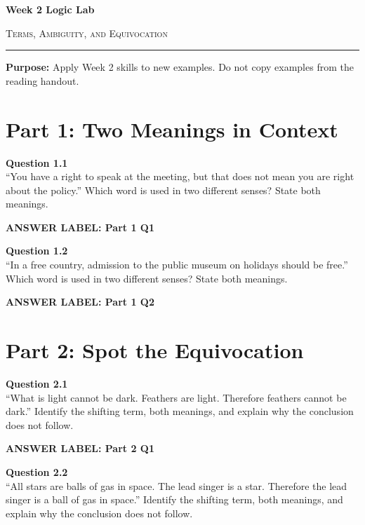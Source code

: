 \documentclass[12pt]{article}
\newcommand{\answerbox}[2]{%
\vspace{0.15em}
\noindent\textbf{#1}\par
\vspace{0.05em}
\noindent\fbox{%
\begin{minipage}[t][#2]{\dimexpr\textwidth-2\fboxsep-2\fboxrule}
\rule{\textwidth}{0pt}
\vspace{#2}
\end{minipage}
}\par
\vspace{0.25em}
}
\begin{document}
\begin{center}
{\LARGE\bfseries Week 2 Logic Lab}\par\vspace{0.05em}
{\large\scshape Terms, Ambiguity, and Equivocation}\par\vspace{0.1em}
\rule{0.78\textwidth}{0.5pt}\par\vspace{0.15em}
\end{center}

\noindent\textbf{Purpose:} Apply Week 2 skills to new examples. Do not copy examples from the reading handout.

\vspace{0.3em}

\section*{Part 1: Two Meanings in Context}

\textbf{Question 1.1}\\[-0.15em]
``You have a right to speak at the meeting, but that does not mean you are right about the policy.'' Which word is used in two different senses? State both meanings.

\answerbox{ANSWER LABEL: Part 1 Q1}{1.55in}

\textbf{Question 1.2}\\[-0.15em]
``In a free country, admission to the public museum on holidays should be free.'' Which word is used in two different senses? State both meanings.

\answerbox{ANSWER LABEL: Part 1 Q2}{1.65in}

\newpage

\section*{Part 2: Spot the Equivocation}

\textbf{Question 2.1}\\[-0.15em]
``What is light cannot be dark. Feathers are light. Therefore feathers cannot be dark.'' Identify the shifting term, both meanings, and explain why the conclusion does not follow.

\answerbox{ANSWER LABEL: Part 2 Q1}{2.45in}

\textbf{Question 2.2}\\[-0.15em]
``All stars are balls of gas in space. The lead singer is a star. Therefore the lead singer is a ball of gas in space.'' Identify the shifting term, both meanings, and explain why the conclusion does not follow.
\end{document}
